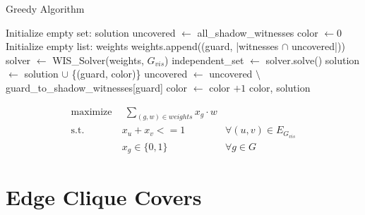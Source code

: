 \begin{algorithm}
\caption{Greedy Algorithm}\label{alg:greedy}
\begin{algorithmic}[1]
\State Initialize empty set: solution
\State uncovered $\gets$ all\_shadow\_witnesses
\State color $\gets 0$
    \State Initialize empty list: weights
        \State weights.append((guard, |witnesses $\cap$ uncovered|))
    \EndFor
    \State solver $\gets$ WIS\_Solver(weights, $G_{vis}$)
    \State independent\_set $\gets$ solver.solve()
        \State solution $\gets$ solution $\cup$ \{(guard, color)\}
        \State uncovered $\gets$ uncovered $\setminus$ guard\_to\_shadow\_witnesses[guard]
    \EndFor 
    \State color $\gets$ color $+ 1$
\EndWhile
\State \Return color, solution
\EndProcedure
\end{algorithmic}
\end{algorithm}

\begin{align}
\label{eq_MIP:f.0} \mbox{maximize}~& \;\sum_{(g, w)\in weights} x_{g}\cdot w& \\
\label{eq_MIP:f.1} \mbox{s.t. } &x_{u} + x_{v} <= 1 & \forall (u,v) \in E_{G_{vis}}\\
\label{eq_MIP:f.6}& x_{g} \in \{0,1\} & \forall g\in G
\end{align}

\section{Edge Clique Covers}

